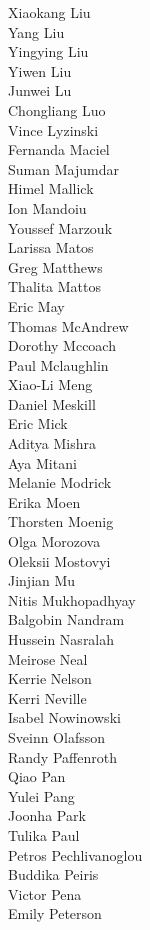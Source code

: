 Xiaokang Liu\\
Yang Liu\\
Yingying Liu\\
Yiwen Liu\\
Junwei Lu\\
Chongliang Luo\\
Vince Lyzinski\\
Fernanda Maciel\\
Suman Majumdar\\
Himel Mallick\\
Ion Mandoiu\\
Youssef Marzouk\\
Larissa Matos\\
Greg Matthews\\
Thalita Mattos\\
Eric May\\
Thomas McAndrew\\
Dorothy Mccoach\\
Paul Mclaughlin\\
Xiao-Li Meng\\
Daniel Meskill\\
Eric Mick\\
Aditya Mishra\\
Aya Mitani\\
Melanie Modrick\\
Erika Moen\\
Thorsten Moenig\\
Olga Morozova\\
Oleksii Mostovyi\\
Jinjian Mu\\
Nitis Mukhopadhyay\\
Balgobin Nandram\\
Hussein Nasralah\\
Meirose Neal\\
Kerrie Nelson\\
Kerri Neville\\
Isabel Nowinowski\\
Sveinn Olafsson\\
Randy Paffenroth\\
Qiao Pan\\
Yulei Pang\\
Joonha Park\\
Tulika Paul\\
Petros Pechlivanoglou\\
Buddika Peiris\\
Victor Pena\\
Emily Peterson\\
